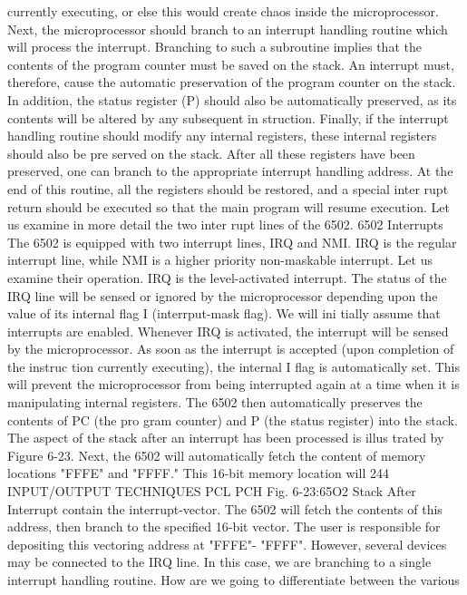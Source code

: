 \documentclass{book}
\begin{document}
currently executing, or else this would create chaos inside the
microprocessor. Next, the microprocessor should branch to an
interrupt handling routine which will process the interrupt. Branching
to such a subroutine implies that the contents of the program counter
must be saved on the stack. An interrupt must, therefore, cause
the automatic preservation of the program counter on the stack.
In addition, the status register (P) should also be automatically
preserved, as its contents will be altered by any subsequent in
struction. Finally, if the interrupt handling routine should modify
any internal registers, these internal registers should also be pre
served on the stack.
After all these registers have been preserved, one can branch to
the appropriate interrupt handling address. At the end of this
routine, all the registers should be restored, and a special inter
rupt return should be executed so that the main program will
resume execution. Let us examine in more detail the two inter
rupt lines of the 6502.
6502 Interrupts
The 6502 is equipped with two interrupt lines, IRQ and NMI.
IRQ is the regular interrupt line, while NMI is a higher priority
non-maskable interrupt. Let us examine their operation.
IRQ is the level-activated interrupt. The status of the IRQ line
will be sensed or ignored by the microprocessor depending upon
the value of its internal flag I (interrput-mask flag). We will ini
tially assume that interrupts are enabled. Whenever IRQ is
activated, the interrupt will be sensed by the microprocessor. As
soon as the interrupt is accepted (upon completion of the instruc
tion currently executing), the internal I flag is automatically set.
This will prevent the microprocessor from being interrupted
again at a time when it is manipulating internal registers. The
6502 then automatically preserves the contents of PC (the pro
gram counter) and P (the status register) into the stack. The
aspect of the stack after an interrupt has been processed is illus
trated by Figure 6-23.
Next, the 6502 will automatically fetch the content of memory
locations "FFFE" and "FFFF." This 16-bit memory location will
244
INPUT/OUTPUT TECHNIQUES
PCL
PCH
Fig. 6-23:65O2 Stack After Interrupt
contain the interrupt-vector. The 6502 will fetch the contents of
this address, then branch to the specified 16-bit vector. The user is
responsible for depositing this vectoring address at "FFFE"-
"FFFF". However, several devices may be connected to the IRQ
line. In this case, we are branching to a single interrupt handling
routine. How are we going to differentiate between the various
\end{document}
